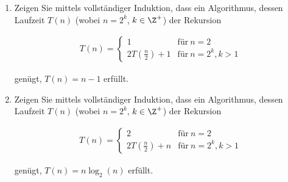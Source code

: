 
\begin{exercise}

\phantom{}

\begin{enumerate}[label = (\alph*)]

    \item Zeigen Sie mittels vollständiger Induktion, dass ein Algorithmus, dessen Laufzeit $T(n)$ (wobei $n = 2^k$, $k \in \Z^+$) der Rekursion

    \begin{align*}
        T(n)
        =
        \begin{cases}
            1                    & \text{für}~ n = 2 \\
            2 T(\frac{n}{2}) + 1 & \text{für}~ n = 2^k, k > 1
        \end{cases}
    \end{align*}

    genügt, $T(n) = n - 1$ erfüllt.

    \item Zeigen Sie mittels vollständiger Induktion, dass ein Algorithmus, dessen Laufzeit $T(n)$ (wobei $n = 2^k$, $k \in \Z^+$) der Rekursion

    \begin{align*}
        T(n)
        =
        \begin{cases}
            2                    & \text{für}~ n = 2 \\
            2 T(\frac{n}{2}) + n & \text{für}~ n = 2^k, k > 1
        \end{cases}
    \end{align*}

    genügt, $T(n) = n \log_2{(n)}$ erfüllt.

\end{enumerate}


\end{exercise}


